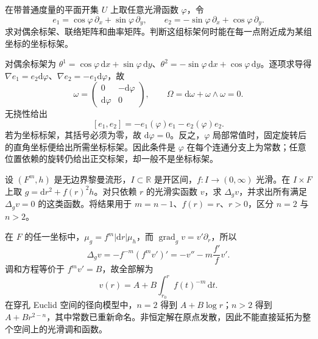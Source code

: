 \begin{exercise}\label{g3:ex:rotating-frame}
	在带普通度量的平面开集 \(U\) 上取任意光滑函数 \(\varphi\)，令
	\[
		e_1=\cos\varphi\,\partial_x+\sin\varphi\,\partial_y,\qquad
		e_2=-\sin\varphi\,\partial_x+\cos\varphi\,\partial_y.
	\]
	求对偶余标架、联络矩阵和曲率矩阵。判断这组标架何时能在每一点附近成为某组坐标的坐标标架。
\end{exercise}
\begin{solution}
	对偶余标架为 \(\theta^1=\cos\varphi\,\mathrm dx+\sin\varphi\,\mathrm dy\)、\(\theta^2=-\sin\varphi\,\mathrm dx+\cos\varphi\,\mathrm dy\)。逐项求导得 \(\nabla e_1=e_2\mathrm d\varphi\)、\(\nabla e_2=-e_1\mathrm d\varphi\)，故
	\[
		\omega=\begin{pmatrix}0&-\mathrm d\varphi\\\mathrm d\varphi&0\end{pmatrix},\qquad
		\Omega=\mathrm d\omega+\omega\wedge\omega=0.
	\]
	无挠性给出
	\[
		[e_1,e_2]=-e_1(\varphi)e_1-e_2(\varphi)e_2.
	\]
	若为坐标标架，其括号必须为零，故 \(\mathrm d\varphi=0\)。反之，\(\varphi\) 局部常值时，固定旋转后的直角坐标便给出所需坐标标架。因此条件是 \(\varphi\) 在每个连通分支上为常数；任意位置依赖的旋转仍给出正交标架，却一般不是坐标标架。
\end{solution}

\begin{exercise}\label{g3:ex:warped-radial-laplacian}
	设 \((F^m,h)\) 是无边界黎曼流形，\(I\subset\mathbb R\) 是开区间，\(f:I\to(0,\infty)\) 光滑。在 \(I\times F\) 上取 \(g=\mathrm dr^2+f(r)^2h\)。对只依赖 \(r\) 的光滑实函数 \(v\)，求 \(\Delta_gv\)，并求出所有满足 \(\Delta_gv=0\) 的这类函数。将结果用于 \(m=n-1\)、\(f(r)=r\)、\(r>0\)，区分 \(n=2\) 与 \(n>2\)。
\end{exercise}
\begin{solution}
	在 \(F\) 的任一坐标中，\(\mu_g=f^m|\mathrm dr|\mu_h\)，而 \(\operatorname{grad}_g v=v'\partial_r\)，所以
	\[
		\Delta_gv=-f^{-m}(f^mv')'
		=-v''-m\frac{f'}f v'.
	\]
	调和方程等价于 \(f^mv'=B\)，故全部解为
	\[
		v(r)=A+B\int_{r_0}^r f(t)^{-m}\,\mathrm dt.
	\]
	在穿孔 Euclid 空间的径向模型中，\(n=2\) 得到 \(A+B\log r\)；\(n>2\) 得到 \(A+Br^{2-n}\)，其中常数已重新命名。非恒定解在原点发散，因此不能直接延拓为整个空间上的光滑调和函数。
\end{solution}

